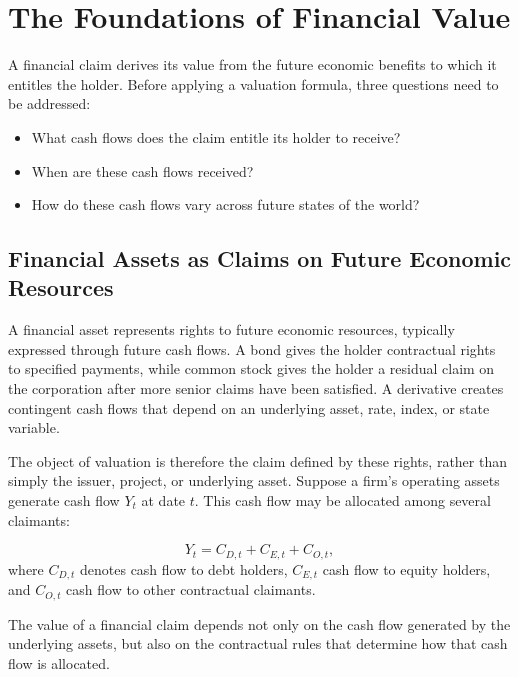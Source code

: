 \section{The Foundations of Financial Value}

A financial claim derives its value from the future economic benefits to which it entitles the holder. Before applying a valuation formula, three questions need to be addressed:


\begin{itemize}[
  leftmargin=2.2em,
  itemsep=0.45em,
  topsep=0.55em
]

\item What cash flows does the claim entitle its holder to receive?

\item When are these cash flows received?

\item How do these cash flows vary across future states of the world?

\end{itemize}

\subsection{Financial Assets as Claims on Future Economic Resources}

A financial asset represents rights to future economic resources, typically expressed through future cash flows.
A bond gives the holder contractual rights to specified payments, while common stock gives the holder a residual claim on the corporation after more senior claims have been satisfied. A derivative creates contingent cash flows that depend on an underlying asset, rate, index, or state variable.

The object of valuation is therefore the claim defined by these rights, rather than simply the issuer, project, or underlying asset. Suppose a firm's operating assets generate cash flow $Y_t$ at date $t$. This cash flow may be allocated among several claimants:

\begin{equation}
Y_t=C_{D,t}+C_{E,t}+C_{O,t},
\label{eq:ch5-cash-flow-allocation}
\end{equation}
where $C_{D,t}$ denotes cash flow to debt holders, $C_{E,t}$ cash flow to equity holders, and $C_{O,t}$ cash flow to other contractual claimants.

The value of a financial claim depends not only on the cash flow generated by the underlying assets, but also on the contractual rules that determine how that cash flow is allocated.

